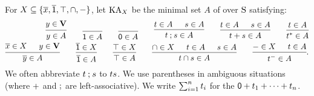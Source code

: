 For $X \subseteq \{\overline{x}, \overline{\mathsf{1}}, \top, \cap, -\}$,
let $\mathrm{KA}_{X}$ be the minimal set $A$ of  over $\mathrm{S}$ satisfying:
\begin{align*}
    \begin{prooftree}
        \hypo{y \in \vsig}
        \infer1{y \in A}
    \end{prooftree}
    \qquad
    \begin{prooftree}
        \hypo{\mathstrut}
        \infer1{\id \in A}
    \end{prooftree}
    \qquad
    \begin{prooftree}
        \hypo{\mathstrut}
        \infer1{\emp \in A}
    \end{prooftree}
    \qquad
    \begin{prooftree}
        \hypo{\term[1] \in A}
        \hypo{\term[2] \in A}
        \infer2{\term[1] \compo \term[2] \in A}
    \end{prooftree}
    \qquad
    \begin{prooftree}
        \hypo{\term[1] \in A}
        \hypo{\term[2] \in A}
        \infer2{\term[1] \union \term[2] \in A}
    \end{prooftree}
    \qquad
    \begin{prooftree}
        \hypo{\term[1] \in A}
        \infer1{\term[1]^{\kstar} \in A}
    \end{prooftree} \\
    \begin{prooftree}
        \hypo{\com{x} \in X}
        \hypo{y \in \vsig}
        \infer2{\com{y} \in A}
    \end{prooftree}
    \qquad
    \begin{prooftree}
        \hypo{\com{\id} \in X}
        \infer1{\com{\id} \in A}
    \end{prooftree}
    \qquad
    \begin{prooftree}
        \hypo{\top \in X}
        \infer1{\top \in A}
    \end{prooftree}
    \qquad
    \begin{prooftree}
        \hypo{\cap \in X}
        \hypo{\term[1] \in A}
        \hypo{\term[2] \in A}
        \infer3{\term[1] \cap \term[2] \in A}
    \end{prooftree}
    \qquad
    \begin{prooftree}
        \hypo{- \in X}
        \hypo{\term[1] \in A}
        \infer2{\term[1]^{-} \in A}
    \end{prooftree}.
\end{align*}
We often abbreviate $\term[1] \compo \term[2]$ to $\term[1] \term[2]$.
We use parentheses in ambiguous situations (where $\mathbin{+}$ and $\mathbin{;}$ are left-associative).
We write $\sum_{i = 1}^{n} \term[1]_i$ for the  $\emp \union \term[1]_1 \union \dots \union \term[1]_n$.

